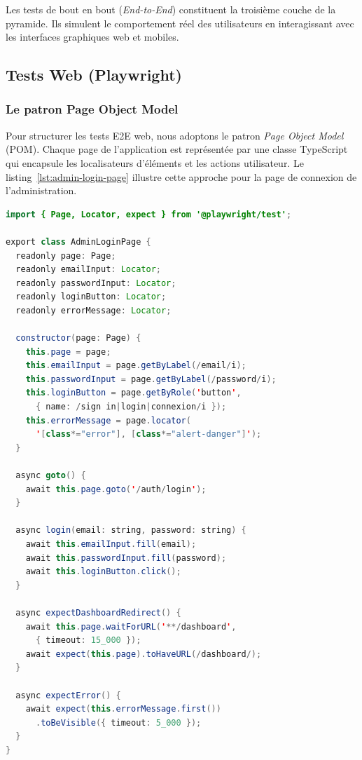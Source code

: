 Les tests de bout en bout (\textit{End-to-End}) constituent la troisième couche de
la pyramide. Ils simulent le comportement réel des utilisateurs en interagissant avec
les interfaces graphiques web et mobiles.

\subsection{Tests Web (Playwright)}
\label{subsec:tests-web}

\subsubsection{Le patron Page Object Model}

Pour structurer les tests E2E web, nous adoptons le patron \textit{Page Object Model}
(POM). Chaque page de l'application est représentée par une classe TypeScript qui
encapsule les localisateurs d'éléments et les actions utilisateur. Le
listing~\ref{lst:admin-login-page} illustre cette approche pour la page de connexion
de l'administration.

\begin{lstlisting}[language=Java, caption={Page Object -- AdminLoginPage}, label={lst:admin-login-page}]
import { Page, Locator, expect } from '@playwright/test';

export class AdminLoginPage {
  readonly page: Page;
  readonly emailInput: Locator;
  readonly passwordInput: Locator;
  readonly loginButton: Locator;
  readonly errorMessage: Locator;

  constructor(page: Page) {
    this.page = page;
    this.emailInput = page.getByLabel(/email/i);
    this.passwordInput = page.getByLabel(/password/i);
    this.loginButton = page.getByRole('button',
      { name: /sign in|login|connexion/i });
    this.errorMessage = page.locator(
      '[class*="error"], [class*="alert-danger"]');
  }

  async goto() {
    await this.page.goto('/auth/login');
  }

  async login(email: string, password: string) {
    await this.emailInput.fill(email);
    await this.passwordInput.fill(password);
    await this.loginButton.click();
  }

  async expectDashboardRedirect() {
    await this.page.waitForURL('**/dashboard',
      { timeout: 15_000 });
    await expect(this.page).toHaveURL(/dashboard/);
  }

  async expectError() {
    await expect(this.errorMessage.first())
      .toBeVisible({ timeout: 5_000 });
  }
}
\end{lstlisting}

